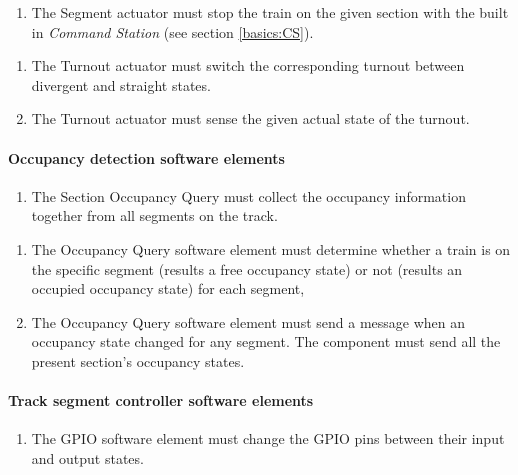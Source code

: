 \begin{enumerate}[label=REQ-SA-\arabic*, leftmargin=*, format=\small]
	\item The Segment actuator must stop the train on the given section with the built in \textit{Command Station} (see section \ref{basics:CS}).
\end{enumerate}

\begin{enumerate}[label=REQ-TA-\arabic*, leftmargin=*, format=\small]
	\item The Turnout actuator must switch the corresponding turnout between divergent and straight states.
	\item The Turnout actuator must sense the given actual state of the turnout.
\end{enumerate}

\paragraph{Occupancy detection software elements}
\begin{enumerate}[label=REQ-SOQ-\arabic*, leftmargin=*, format=\small]
	\item The Section Occupancy Query must collect the occupancy information together from all segments on the track. \label{req:SOQ}
\end{enumerate}

\begin{enumerate}[label=REQ-OCQ-\arabic*, leftmargin=*, format=\small] 
	\item The Occupancy Query software element must determine whether a train is on the specific segment (results a free occupancy state) or not (results an occupied occupancy state) for each segment,  \label{req:OCQ-1}
	\item The Occupancy Query software element must send a message when an occupancy state changed for any segment. The component must send all the present section's occupancy states. \label{req:OCQ-2}
\end{enumerate}

\paragraph{Track segment controller software elements}
\begin{enumerate}[label=REQ-GPIO-\arabic*, leftmargin=*, format=\small] 
	\item The GPIO software element must change the GPIO pins between their input and output states. \label{req:GPIO}
\end{enumerate}

